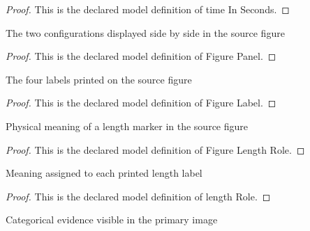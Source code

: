 \begin{proof}
  This is the declared model definition of time In Seconds.
\end{proof}
\begin{definition}
  \label{def:physics:phyx-mini-0238:phyxminiproblems-problemphyxmini0238-figurepanel}
  The two configurations displayed side by side in the source figure
\end{definition}
\begin{proof}
  This is the declared model definition of Figure Panel.
\end{proof}
\begin{definition}
  \label{def:physics:phyx-mini-0238:phyxminiproblems-problemphyxmini0238-figurelabel}
  The four labels printed on the source figure
\end{definition}
\begin{proof}
  This is the declared model definition of Figure Label.
\end{proof}
\begin{definition}
  \label{def:physics:phyx-mini-0238:phyxminiproblems-problemphyxmini0238-figurelengthrole}
  Physical meaning of a length marker in the source figure
\end{definition}
\begin{proof}
  This is the declared model definition of Figure Length Role.
\end{proof}
\begin{definition}
  \label{def:physics:phyx-mini-0238:phyxminiproblems-problemphyxmini0238-figurelabel-lengthrole}
  Meaning assigned to each printed length label
\end{definition}
\begin{proof}
  This is the declared model definition of length Role.
\end{proof}
\begin{definition}
  \label{def:physics:phyx-mini-0238:phyxminiproblems-problemphyxmini0238-pendulumfigure}
  Categorical evidence visible in the primary image
\end{definition}
